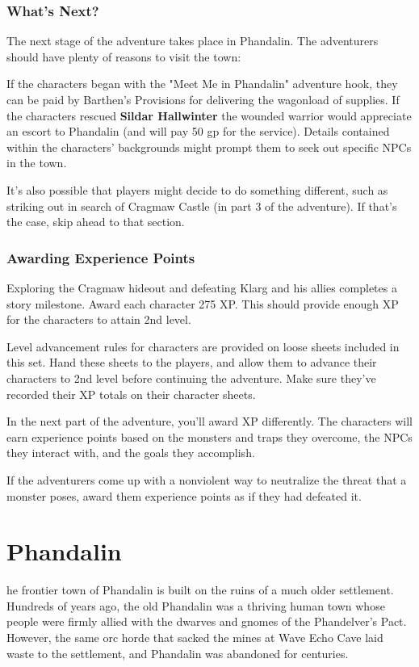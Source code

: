 \documentclass[10pt,a4paper,twoside,bg=print,twocolumn,openany,nodeprecatedcode]{dndbook}
\begin{document}
\subsection{What's Next?}
The next stage of the adventure takes place in Phandalin. The adventurers should have plenty of reasons to visit the town:

If the characters began with the "Meet Me in Phandalin" adventure hook, they can be paid by Barthen's Provisions for delivering the wagonload of supplies. If the characters rescued \textbf{Sildar Hallwinter} the wounded warrior would appreciate an escort to Phandalin (and will pay 50 gp for the service). Details contained within the characters' backgrounds might prompt them to seek out specific NPCs in the town.

It's also possible that players might decide to do something different, such as striking out in search of Cragmaw Castle (in part 3 of the adventure). If that's the case, skip ahead to that section.

\subsection{Awarding Experience Points}
Exploring the Cragmaw hideout and defeating Klarg and his allies completes a story milestone. Award each character 275 XP. This should provide enough XP for the characters to attain 2nd level.

Level advancement rules for characters are provided on loose sheets included in this set. Hand these sheets to the players, and allow them to advance their characters to 2nd level before continuing the adventure. Make sure they've recorded their XP totals on their character sheets.

In the next part of the adventure, you'll award XP differently. The characters will earn experience points based on the monsters and traps they overcome, the NPCs they interact with, and the goals they accomplish.

If the adventurers come up with a nonviolent way to neutralize the threat that a monster poses, award them experience points as if they had defeated it.

\chapter{Phandalin}
he frontier town of Phandalin is built on the ruins of a much older settlement. Hundreds of years ago, the old Phandalin was a thriving human town whose people were firmly allied with the dwarves and gnomes of the Phandelver's Pact. However, the same orc horde that sacked the mines at Wave Echo Cave laid waste to the settlement, and Phandalin was abandoned for centuries.
\end{document}
